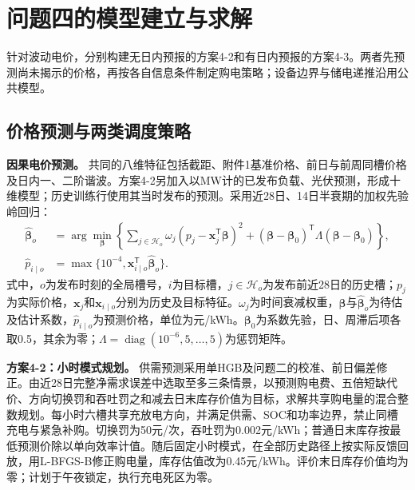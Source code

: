 \section{问题四的模型建立与求解}
\label{sec:q4}

针对波动电价，分别构建无日内预报的方案4-2和有日内预报的方案4-3。两者先预测尚未揭示的价格，再按各自信息条件制定购电策略；设备边界与储电递推沿用公共模型。

\subsection{价格预测与两类调度策略}

\textbf{因果电价预测。}
共同的八维特征包括截距、附件1基准价格、前日与前周同槽价格及日内一、二阶谐波。方案4-2另加入以MW计的已发布负载、光伏预测，形成十维模型；历史训练行使用其当时发布的预测。采用近28日、14日半衰期的加权先验岭回归：
\begin{equation}\label{eq:q4-price}
 \begin{aligned}
 \widehat{\boldsymbol\beta}_o
 &=\arg\min_{\boldsymbol\beta}
 \left\{\sum_{j\in\mathcal H_o}\omega_j
 (p_j-\boldsymbol x_j^{\mathsf T}\boldsymbol\beta)^2
 +(\boldsymbol\beta-\boldsymbol\beta_0)^{\mathsf T}
 \Lambda(\boldsymbol\beta-\boldsymbol\beta_0)\right\},\\
 \widehat p_{i\mid o}&=\max\{10^{-4},\boldsymbol x_{i\mid o}^{\mathsf T}\widehat{\boldsymbol\beta}_o\}.
 \end{aligned}
\end{equation}
式中，$o$为发布时刻的全局槽号，$i$为目标槽，$j\in\mathcal H_o$为发布前近28日的历史槽；$p_j$为实际价格，$\boldsymbol x_j$和$\boldsymbol x_{i\mid o}$分别为历史及目标特征。$\omega_j$为时间衰减权重，$\boldsymbol\beta$与$\widehat{\boldsymbol\beta}_o$为待估及估计系数，$\widehat p_{i\mid o}$为预测价格，单位为元/kWh。$\boldsymbol\beta_0$为系数先验，日、周滞后项各取0.5，其余为零；$\Lambda=\operatorname{diag}(10^{-6},5,\ldots,5)$为惩罚矩阵。

\textbf{方案4-2：小时模式规划。}
供需预测采用单HGB及问题二的校准、前日偏差修正。由近28日完整净需求误差中选取至多三条情景，以预测购电费、五倍短缺代价、方向切换罚和吞吐罚之和减去日末库存价值为目标，求解共享购电量的混合整数规划。每小时六槽共享充放电方向，并满足供需、SOC和功率边界，禁止同槽充电与紧急补购。切换罚为50元/次，吞吐罚为0.002元/kWh；普通日末库存按最低预测价除以单向效率计值。随后固定小时模式，在全部历史路径上按实际反馈回放，用L-BFGS-B修正购电量，库存估值改为0.45元/kWh。评价末日库存价值均为零；计划于午夜锁定，执行充电死区为零。


